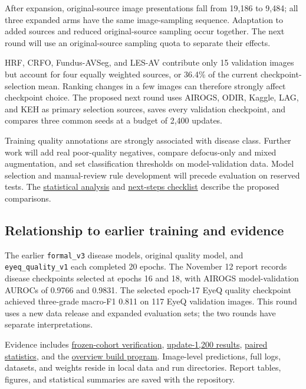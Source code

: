 \documentclass[
  10pt,
]{article}
\begin{document}
After expansion, original-source image presentations fall from 19,186 to
9,484; all three expanded arms have the same image-sampling sequence.
Adaptation to added sources and reduced original-source sampling occur
together. The next round will use an original-source sampling quota to
separate their effects.

HRF, CRFO, Fundus-AVSeg, and LES-AV contribute only 15 validation images
but account for four equally weighted sources, or 36.4\% of the current
checkpoint-selection mean. Ranking changes in a few images can therefore
strongly affect checkpoint choice. The proposed next round uses AIROGS,
ODIR, Kaggle, LAG, and KEH as primary selection sources, saves every
validation checkpoint, and compares three common seeds at a budget of
2,400 updates.

Training quality annotations are strongly associated with disease class.
Further work will add real poor-quality negatives, compare defocus-only
and mixed augmentation, and set classification thresholds on
model-validation data. Model selection and manual-review rule
development will precede evaluation on reserved tests. The
\href{experimental-analysis/experimental-analysis.en.md}{statistical
analysis} and \href{../../operations/next-steps.en.md}{next-steps
checklist} describe the proposed comparisons.

\subsection{Relationship to earlier training and
evidence}\label{relationship-to-earlier-training-and-evidence}

The earlier \texttt{formal\_v3} disease models, original quality model,
and \texttt{eyeq\_quality\_v1} each completed 20 epochs. The November 12
report records disease checkpoints selected at epochs 16 and 18, with
AIROGS model-validation AUROCs of 0.9766 and 0.9831. The selected
epoch-17 EyeQ quality checkpoint achieved three-grade macro-F1 0.811 on
117 EyeQ validation images. This round uses a new data release and
expanded evaluation sets; the two rounds have separate interpretations.

Evidence includes
\href{../../../data/prepared/expanded_20261113/cohort_verification.json}{frozen-cohort
verification},
\href{../../../runs/expanded_20261113/budget_end_comparison.json}{update-1,200
results}, \href{experimental-analysis/analysis.json}{paired statistics},
and the
\href{../../../tools/build_progress_overview_20261113.py}{overview build
program}. Image-level predictions, full logs, datasets, and weights
reside in local data and run directories. Report tables, figures, and
statistical summaries are saved with the repository.
\end{document}
